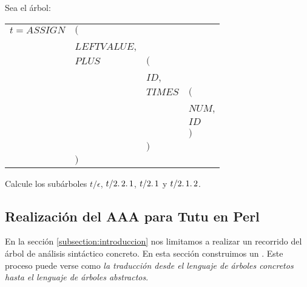 \begin{exercise}
Sea el árbol:

\vspace{0.5cm}
\begin{tabular}{llll}
$t = ASSIGN$  & $($          &         &\\
          & $LEFTVALUE$, &   &\\
          & $PLUS$       & $($     &\\
          &              & $ID$,   & \\
          &              & $TIMES$ & $($\\
          &              &         & $NUM$,\\
          &              &         & $ID$\\
          &              &         & $)$\\
          &              & $)$     &\\
          & $)$          &         &
\end{tabular}

\vspace{0.5cm}
Calcule los subárboles $t/\epsilon$, $t/2\ldotp2\ldotp1$, $t/2\ldotp1$ y $t/2\ldotp1\ldotp2$.
\end{exercise}

\subsection{Realización del AAA para Tutu en Perl}
En la sección 
\ref{subsection:introduccion}
nos limitamos a realizar un recorrido del árbol
de análisis sintáctico concreto. En esta sección construimos un 
. Este proceso puede
verse como \emph{la traducción desde el lenguaje de árboles concretos
hasta el lenguaje de árboles abstractos}.

